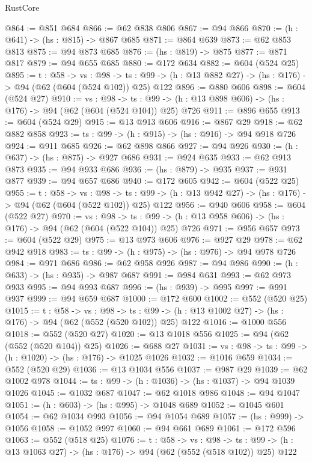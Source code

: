 \begin{lexlean}{RustCore}
\begin{coremodule}
@864 := @851 @684
@866 := @62 @838 @806
@867 := @94 @866
@870 := (h : @641) -> (hs : @815) -> @867 @685
@871 := @864 @639
@873 := @62 @853 @813
@875 := @94 @873 @685
@876 := (hs : @819) -> @875
@877 := @871 @817
@879 := @94 @655 @685
@880 := @172 @634
@882 := @604 (@524 @25)
@895 := {t : @58} ->
  {vs : @98} ->
  {ts : @99} -> (h : @13 @882 @27) -> (hs : @176) -> @94 (@62 (@604 (@524 @102)) @25) @122
@896 := @880 @606
@898 := @604 (@524 @27)
@910 := {vs : @98} ->
  {ts : @99} -> (h : @13 @898 @606) -> (hs : @176) -> @94 (@62 (@604 (@524 @104)) @25) @726
@911 := @896 @655
@913 := @604 (@524 @29)
@915 := @13 @913 @606
@916 := @867 @29
@918 := @62 @882 @858
@923 := {ts : @99} -> (h : @915) -> (hs : @916) -> @94 @918 @726
@924 := @911 @685
@926 := @62 @898 @866
@927 := @94 @926
@930 := (h : @637) -> (hs : @875) -> @927 @686
@931 := @924 @635
@933 := @62 @913 @873
@935 := @94 @933 @686
@936 := (hs : @879) -> @935
@937 := @931 @877
@939 := @94 @657 @686
@940 := @172 @605
@942 := @604 (@522 @25)
@955 := {t : @58} ->
  {vs : @98} ->
  {ts : @99} -> (h : @13 @942 @27) -> (hs : @176) -> @94 (@62 (@604 (@522 @102)) @25) @122
@956 := @940 @606
@958 := @604 (@522 @27)
@970 := {vs : @98} ->
  {ts : @99} -> (h : @13 @958 @606) -> (hs : @176) -> @94 (@62 (@604 (@522 @104)) @25) @726
@971 := @956 @657
@973 := @604 (@522 @29)
@975 := @13 @973 @606
@976 := @927 @29
@978 := @62 @942 @918
@983 := {ts : @99} -> (h : @975) -> (hs : @976) -> @94 @978 @726
@984 := @971 @686
@986 := @62 @958 @926
@987 := @94 @986
@990 := (h : @633) -> (hs : @935) -> @987 @687
@991 := @984 @631
@993 := @62 @973 @933
@995 := @94 @993 @687
@996 := (hs : @939) -> @995
@997 := @991 @937
@999 := @94 @659 @687
@1000 := @172 @600
@1002 := @552 (@520 @25)
@1015 := {t : @58} ->
  {vs : @98} ->
  {ts : @99} -> (h : @13 @1002 @27) -> (hs : @176) -> @94 (@62 (@552 (@520 @102)) @25) @122
@1016 := @1000 @556
@1018 := @552 (@520 @27)
@1020 := @13 @1018 @556
@1025 := @94 (@62 (@552 (@520 @104)) @25)
@1026 := @688 @27
@1031 := {vs : @98} -> {ts : @99} -> (h : @1020) -> (hs : @176) -> @1025 @1026
@1032 := @1016 @659
@1034 := @552 (@520 @29)
@1036 := @13 @1034 @556
@1037 := @987 @29
@1039 := @62 @1002 @978
@1044 := {ts : @99} -> (h : @1036) -> (hs : @1037) -> @94 @1039 @1026
@1045 := @1032 @687
@1047 := @62 @1018 @986
@1048 := @94 @1047
@1051 := (h : @603) -> (hs : @995) -> @1048 @689
@1052 := @1045 @601
@1054 := @62 @1034 @993
@1056 := @94 @1054 @689
@1057 := (hs : @999) -> @1056
@1058 := @1052 @997
@1060 := @94 @661 @689
@1061 := @172 @596
@1063 := @552 (@518 @25)
@1076 := {t : @58} ->
  {vs : @98} ->
  {ts : @99} -> (h : @13 @1063 @27) -> (hs : @176) -> @94 (@62 (@552 (@518 @102)) @25) @122

\end{coremodule}
\end{lexlean}
